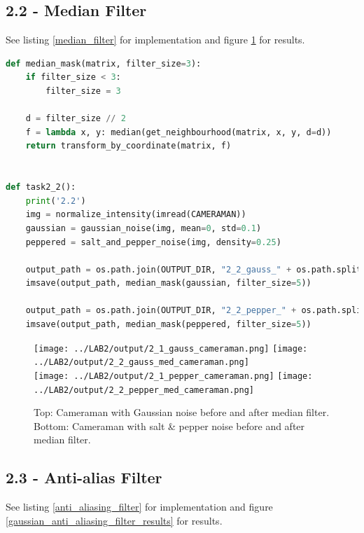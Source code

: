 \newpage
\subsection*{2.2 - Median Filter}

See listing \ref{median_filter} for implementation and figure \ref{median_filter_results} for results.

\begin{lstlisting}[language=Python, label=median_filter, caption=Median Filter]
def median_mask(matrix, filter_size=3):
    if filter_size < 3:
        filter_size = 3

    d = filter_size // 2
    f = lambda x, y: median(get_neighbourhood(matrix, x, y, d=d))
    return transform_by_coordinate(matrix, f)


def task2_2():
    print('2.2')
    img = normalize_intensity(imread(CAMERAMAN))
    gaussian = gaussian_noise(img, mean=0, std=0.1)
    peppered = salt_and_pepper_noise(img, density=0.25)

    output_path = os.path.join(OUTPUT_DIR, "2_2_gauss_" + os.path.split(CAMERAMAN)[-1])
    imsave(output_path, median_mask(gaussian, filter_size=5))

    output_path = os.path.join(OUTPUT_DIR, "2_2_pepper_" + os.path.split(CAMERAMAN)[-1])
    imsave(output_path, median_mask(peppered, filter_size=5))
\end{lstlisting}


\begin{figure}[h!]
    \centering
    \texttt{[image: ../LAB2/output/2\_1\_gauss\_cameraman.png]}
    \texttt{[image: ../LAB2/output/2\_2\_gauss\_med\_cameraman.png]} \\
    \texttt{[image: ../LAB2/output/2\_1\_pepper\_cameraman.png]}
    \texttt{[image: ../LAB2/output/2\_2\_pepper\_med\_cameraman.png]}
    \caption{Top: Cameraman with Gaussian noise before and after median filter. \\ Bottom: Cameraman with salt \& pepper noise before and after median filter.}
    \label{median_filter_results}
\end{figure}


\newpage
\subsection*{2.3 - Anti-alias Filter}

See listing \ref{anti_aliasing_filter} for implementation and figure \ref{gaussian_anti_aliasing_filter_results} for results.

